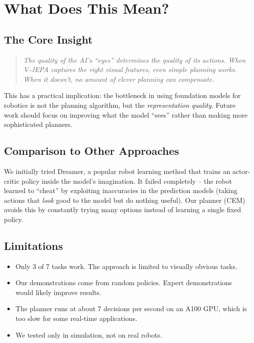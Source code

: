 \documentclass{article}
\begin{document}
\section{What Does This Mean?}

\subsection{The Core Insight}

\begin{quote}
\emph{The quality of the AI's ``eyes'' determines the quality of its actions. When V-JEPA captures the right visual features, even simple planning works. When it doesn't, no amount of clever planning can compensate.}
\end{quote}

This has a practical implication: the bottleneck in using foundation models for robotics is not the planning algorithm, but the \emph{representation quality}. Future work should focus on improving what the model ``sees'' rather than making more sophisticated planners.

\subsection{Comparison to Other Approaches}

We initially tried Dreamer, a popular robot learning method that trains an actor-critic policy inside the model's imagination. It failed completely -- the robot learned to ``cheat'' by exploiting inaccuracies in the prediction models (taking actions that \emph{look} good to the model but do nothing useful). Our planner (CEM) avoids this by constantly trying many options instead of learning a single fixed policy.

\subsection{Limitations}

\begin{itemize}[nosep]
    \item Only 3 of 7 tasks work. The approach is limited to visually obvious tasks.
    \item Our demonstrations come from random policies. Expert demonstrations would likely improve results.
    \item The planner runs at about 7 decisions per second on an A100 GPU, which is too slow for some real-time applications.
    \item We tested only in simulation, not on real robots.
\end{itemize}
\end{document}
